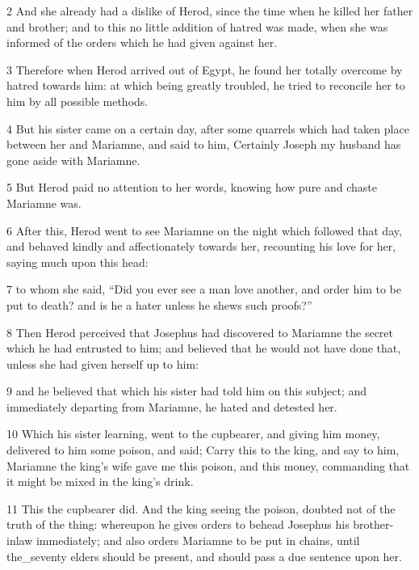 \par 2 And she already had a dislike of Herod, since the time when he killed her father and brother; and to this no little addition of hatred was made, when she was informed of the orders which he had given against her. 

\par 3 Therefore when Herod arrived out of Egypt, he found her totally overcome by hatred towards him: at which being greatly troubled, he tried to reconcile her to him by all possible methods. 

\par 4 But his sister came on a certain day, after some quarrels which had taken place between her and Mariamne, and said to him, Certainly Joseph my husband has gone aside with Mariamne. 

\par 5 But Herod paid no attention to her words, knowing how pure and chaste Mariamne was. 

\par 6 After this, Herod went to see Mariamne on the night which followed that day, and behaved kindly and affectionately towards her, recounting his love for her, saying much upon this head: 

\par 7 to whom she said, “Did you ever see a man love another, and order him to be put to death? and is he a hater unless he shews such proofs?” 

\par 8 Then Herod perceived that Josephus had discovered to Mariamne the secret which he had entrusted to him; and believed that he would not have done that, unless she had given herself up to him: 

\par 9 and he believed that which his sister had told him on this subject; and immediately departing from Mariamne, he hated and detested her. 

\par 10 Which his sister learning, went to the cupbearer, and giving him money, delivered to him some poison, and said; Carry this to the king, and say to him, Mariamne the king’s wife gave me this poison, and this money, commanding that it might be mixed in the king’s drink. 

\par 11 This the cupbearer did. And the king seeing the poison, doubted not of the truth of the thing: whereupon he gives orders to behead Josephus his brother-inlaw immediately; and also orders Mariamne to be put in chains, until the_seventy elders should be present, and should pass a due sentence upon her. 

